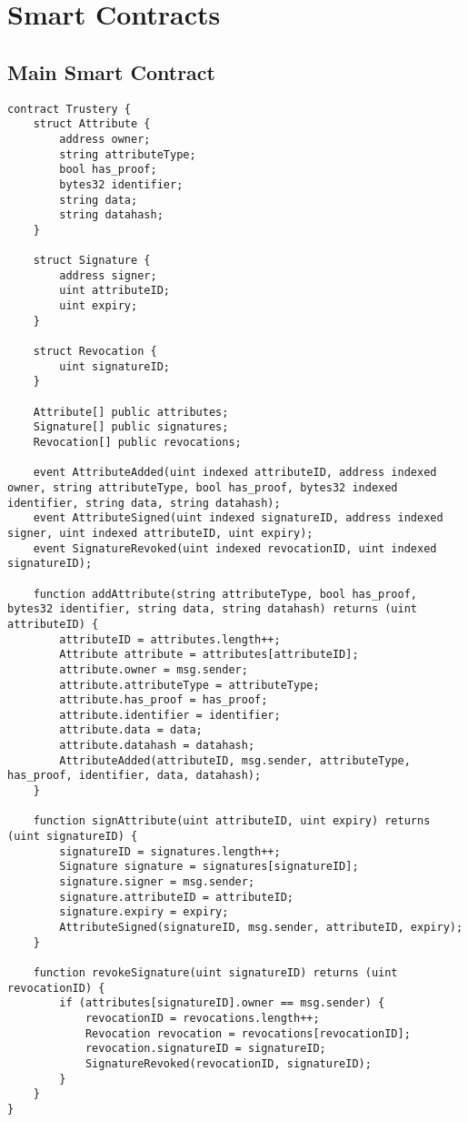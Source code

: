 \documentclass[12pt,a4paper]{report}
\begin{document}
	
	
	
	\appendix
	\chapter{Smart Contracts}
	\section{Main Smart Contract}
	\begin{lstlisting}
contract Trustery {
    struct Attribute {
        address owner;
        string attributeType;
        bool has_proof;
        bytes32 identifier;
        string data;
        string datahash;
    }

    struct Signature {
        address signer;
        uint attributeID;
        uint expiry;
    }

    struct Revocation {
        uint signatureID;
    }

    Attribute[] public attributes;
    Signature[] public signatures;
    Revocation[] public revocations;

    event AttributeAdded(uint indexed attributeID, address indexed owner, string attributeType, bool has_proof, bytes32 indexed identifier, string data, string datahash);
    event AttributeSigned(uint indexed signatureID, address indexed signer, uint indexed attributeID, uint expiry);
    event SignatureRevoked(uint indexed revocationID, uint indexed signatureID);

    function addAttribute(string attributeType, bool has_proof, bytes32 identifier, string data, string datahash) returns (uint attributeID) {
        attributeID = attributes.length++;
        Attribute attribute = attributes[attributeID];
        attribute.owner = msg.sender;
        attribute.attributeType = attributeType;
        attribute.has_proof = has_proof;
        attribute.identifier = identifier;
        attribute.data = data;
        attribute.datahash = datahash;
        AttributeAdded(attributeID, msg.sender, attributeType, has_proof, identifier, data, datahash);
    }

    function signAttribute(uint attributeID, uint expiry) returns (uint signatureID) {
        signatureID = signatures.length++;
        Signature signature = signatures[signatureID];
        signature.signer = msg.sender;
        signature.attributeID = attributeID;
        signature.expiry = expiry;
        AttributeSigned(signatureID, msg.sender, attributeID, expiry);
    }

    function revokeSignature(uint signatureID) returns (uint revocationID) {
        if (attributes[signatureID].owner == msg.sender) {
            revocationID = revocations.length++;
            Revocation revocation = revocations[revocationID];
            revocation.signatureID = signatureID;
            SignatureRevoked(revocationID, signatureID);
        }
    }
}
	\end{lstlisting}
\end{document}
